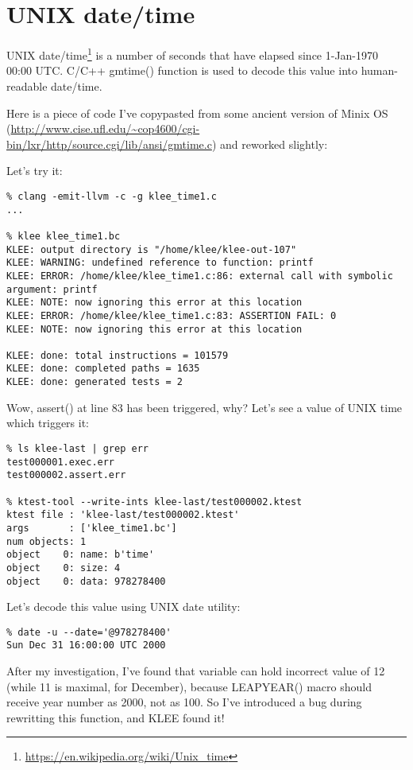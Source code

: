 \section{UNIX date/time}

UNIX date/time\footnote{\url{https://en.wikipedia.org/wiki/Unix_time}} is a number of seconds that have elapsed since 1-Jan-1970 00:00 UTC.
C/C++ gmtime() function is used to decode this value into human-readable date/time.

Here is a piece of code I've copypasted from some ancient version of Minix OS 
(\url{http://www.cise.ufl.edu/~cop4600/cgi-bin/lxr/http/source.cgi/lib/ansi/gmtime.c}) and reworked slightly:



Let's try it:

\begin{lstlisting}
% clang -emit-llvm -c -g klee_time1.c
...

% klee klee_time1.bc
KLEE: output directory is "/home/klee/klee-out-107"
KLEE: WARNING: undefined reference to function: printf
KLEE: ERROR: /home/klee/klee_time1.c:86: external call with symbolic argument: printf
KLEE: NOTE: now ignoring this error at this location
KLEE: ERROR: /home/klee/klee_time1.c:83: ASSERTION FAIL: 0
KLEE: NOTE: now ignoring this error at this location

KLEE: done: total instructions = 101579
KLEE: done: completed paths = 1635
KLEE: done: generated tests = 2
\end{lstlisting}

Wow, assert() at line 83 has been triggered, why?
Let's see a value of UNIX time which triggers it:

\begin{lstlisting}
% ls klee-last | grep err
test000001.exec.err
test000002.assert.err

% ktest-tool --write-ints klee-last/test000002.ktest
ktest file : 'klee-last/test000002.ktest'
args       : ['klee_time1.bc']
num objects: 1
object    0: name: b'time'
object    0: size: 4
object    0: data: 978278400
\end{lstlisting}

Let's decode this value using UNIX date utility:

\begin{lstlisting}
% date -u --date='@978278400'
Sun Dec 31 16:00:00 UTC 2000
\end{lstlisting}

After my investigation, I've found that  variable can hold incorrect value of 12 (while 11 is maximal, for December), 
because LEAPYEAR() macro should receive year number as 2000, not as 100.
So I've introduced a bug during rewritting this function, and KLEE found it!

